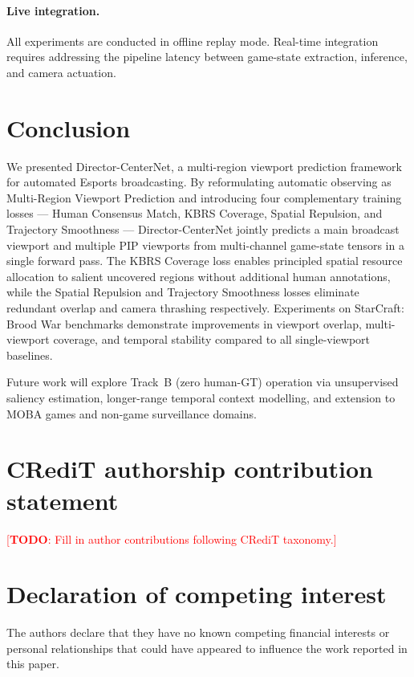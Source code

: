 \documentclass[preprint,12pt]{elsarticle}
\newcommand{\todo}[1]{\textcolor{red}{[\textbf{TODO}: #1]}}
\begin{document}
\paragraph{Live integration.} All experiments are conducted in offline 
replay mode. Real-time integration requires addressing the pipeline latency 
between game-state extraction, inference, and camera actuation.

\section{Conclusion}
\label{sec:conclusion}

We presented Director-CenterNet, a multi-region viewport prediction 
framework for automated Esports broadcasting. By reformulating automatic 
observing as Multi-Region Viewport Prediction and introducing four 
complementary training losses — Human Consensus Match, KBRS Coverage, 
Spatial Repulsion, and Trajectory Smoothness — Director-CenterNet jointly 
predicts a main broadcast viewport and multiple PIP viewports from 
multi-channel game-state tensors in a single forward pass. The KBRS 
Coverage loss enables principled spatial resource allocation to salient 
uncovered regions without additional human annotations, while the Spatial 
Repulsion and Trajectory Smoothness losses eliminate redundant overlap and 
camera thrashing respectively. Experiments on StarCraft: Brood War benchmarks 
demonstrate improvements in viewport overlap, multi-viewport coverage, and 
temporal stability compared to all single-viewport baselines.

Future work will explore Track~B (zero human-GT) operation via unsupervised 
saliency estimation, longer-range temporal context modelling, and extension 
to MOBA games and non-game surveillance domains.


\section*{CRediT authorship contribution statement}
\todo{Fill in author contributions following CRediT taxonomy.}

\section*{Declaration of competing interest}
The authors declare that they have no known competing financial interests 
or personal relationships that could have appeared to influence the work 
reported in this paper.
\end{document}
